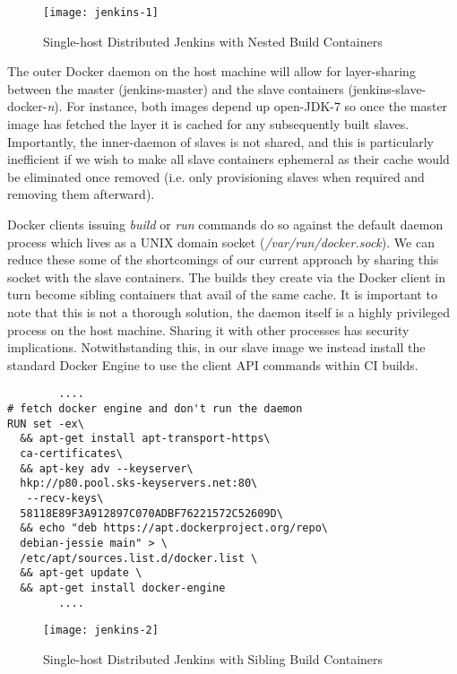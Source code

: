 \documentclass{report}
\begin{document}
\begin{figure}[htp]
      \centering
      \texttt{[image: jenkins-1]}
      \caption{Single-host Distributed Jenkins with Nested Build Containers} 
      \label{fig:jenkins-1}
\end{figure}
\par
The outer Docker daemon on the host machine will allow
for layer-sharing between the master (jenkins-master) and the slave
containers (jenkins-slave-docker-\textit{n}). For instance,
both images depend up open-JDK-7 so once the master image
has fetched the layer it is cached for any subsequently built slaves.
Importantly, the inner-daemon of slaves is not shared, and this is 
particularly inefficient if we wish to make all slave containers ephemeral as
their cache would be eliminated once removed (i.e. only provisioning slaves when required and removing them afterward). 
\par
Docker clients issuing \textit{build} or \textit{run} commands do so
against the default daemon process which lives as a UNIX domain socket 
(\textit{/var/run/docker.sock}). We can reduce these some of the 
shortcomings of our current approach by sharing this socket with the
slave containers. The builds they create via the Docker client in turn
become sibling containers that avail of the same cache.
It is important to note that this is not a thorough solution,
the daemon itself is a highly privileged process on the host machine.
Sharing it with other processes has security implications.
Notwithstanding this, in our slave image we instead install the standard
Docker Engine to use the client API commands within CI builds.
\begin{verbatim}
  		....
# fetch docker engine and don't run the daemon
RUN set -ex\
  && apt-get install apt-transport-https\ 
  ca-certificates\
  && apt-key adv --keyserver\ 
  hkp://p80.pool.sks-keyservers.net:80\
   --recv-keys\
  58118E89F3A912897C070ADBF76221572C52609D\
  && echo "deb https://apt.dockerproject.org/repo\
  debian-jessie main" > \
  /etc/apt/sources.list.d/docker.list \
  && apt-get update \
  && apt-get install docker-engine
		....
\end{verbatim}	
\begin{figure}[htp]
      \centering
      \texttt{[image: jenkins-2]}
      \caption{Single-host Distributed Jenkins with Sibling Build Containers} 
      \label{fig:jenkins-2}
\end{figure}
\end{document}
